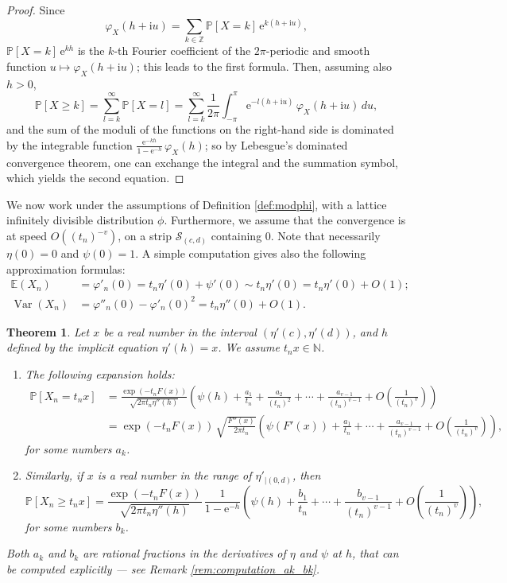 \documentclass[12pt,a4paper,reqno]{amsart}
\newtheorem{theorem}[lemma]{Theorem}
\theoremstyle{remark}
\newcommand{\N}{\mathbb{N}}
\newcommand{\Z}{\mathbb{Z}}
\newcommand{\E}{\mathrm{e}}
\newcommand{\I}{\mathrm{i}}
\newcommand{\esper}{\mathbb{E}}
\newcommand{\proba}{\mathbb{P}}
\DeclareMathOperator\Var{Var}
\begin{document}
\begin{proof}
Since $$\varphi_{X}(h+\I u )=\sum_{k \in \Z} \proba[X=k]\,\E^{k(h+\I u )},$$ $\proba[X=k]\,\E^{kh}$ is the $k$-th Fourier coefficient of the $2\pi$-periodic and smooth function $u \mapsto \varphi_{X}(h+\I u)$; this leads to the first formula. Then, assuming also $h >0$,
$$ \proba[X \geq k]=\sum_{l=k}^{\infty} \proba[X=l] = \sum_{l=k}^{\infty} \frac{1}{2\pi}\int_{-\pi}^{\pi} \E^{-l(h+\I u)}\,\varphi_{X}(h + \I u)\,du, $$
and the sum of the moduli of the functions on the right-hand side is dominated by the integrable function $\frac{\E^{-kh}}{1-\E^{-h}}\,\varphi_{X}(h)$; so by Lebesgue's dominated convergence theorem, one can exchange the integral and the summation symbol, which yields the second equation.
\end{proof}
\bigskip

We now work under the assumptions of Definition \ref{def:modphi}, with a lattice infinitely divisible distribution $\phi$. Furthermore, we assume that the convergence is at speed $O((t_{n})^{-v})$, on a strip $\mathcal{S}_{(c,d)}$ containing $0$. Note that necessarily $\eta(0)=0$ and $\psi(0)=1$. A simple computation gives also the following approximation formulas:
\begin{align*}
    \esper(X_n)&=\varphi'_n(0)=t_n \eta'(0) + \psi'(0) \sim t_n \eta'(0) = t_n \eta'(0) +O(1); \\
    \Var(X_n)&=\varphi''_n(0)-\varphi'_n(0)^2 = t_n \eta''(0) +O(1).
\end{align*}

\begin{theorem}\label{thm:mainlattice}
Let $x$ be a real number in the interval $(\eta'(c),\eta'(d))$, and $h$ defined by the implicit equation $\eta'(h)=x$. We assume $t_{n}x \in \N$. \vspace{2mm}
\begin{enumerate}
\item The following expansion holds:
\begin{align*}
\proba[X_{n}=t_{n}x]&=\frac{\exp(-t_{n}F(x))}{\sqrt{2\pi t_{n}\eta''(h)}} \left(\psi(h)+\frac{a_{1}}{t_{n}}+\frac{a_{2}}{(t_{n})^{2}}+\cdots+\frac{a_{v-1}}{(t_{n})^{v-1}}+O\!\left(\frac{1}{(t_{n})^{v}}\right)\!\right)\\
&= \exp(-t_{n}F(x))\, \sqrt{\frac{F''(x)}{2\pi t_{n}}} \left(\psi(F'(x))+\frac{a_{1}}{t_{n}}+\cdots+\frac{a_{v-1}}{(t_{n})^{v-1}}+O\!\left(\frac{1}{(t_{n})^{v}}\right)\!\right),
\end{align*}
for some numbers $a_k$.\vspace{2mm}
\item Similarly, if $x$ is a real number in the range of $\eta'_{|(0,d)}$, then
$$\proba[X_{n}\geq t_{n}x]= \frac{\exp(-t_{n}F(x))}{\sqrt{2\pi t_{n}\eta''(h)}}\, \frac{1}{1-\E^{-h}}\left(\psi(h)+\frac{b_{1}}{t_{n}}+\cdots+\frac{b_{v-1}}{(t_{n})^{v-1}}+O\!\left(\frac{1}{(t_{n})^{v}}\right)\right),$$
for some numbers $b_k$.\vspace{2mm}
\end{enumerate}
Both $a_k$ and $b_k$ are rational fractions in the derivatives of $\eta$ and $\psi$ at $h$, that can be computed explicitly --- see Remark \ref{rem:computation_ak_bk}.
\end{theorem}\medskip 
\end{document}
